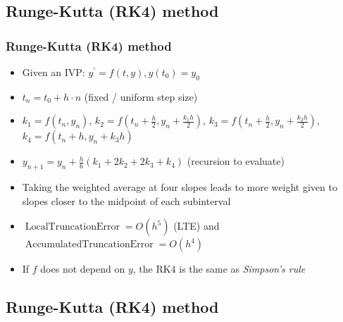 \documentclass[usenames,svgnames,dvipsnames,10pt]{beamer}
\begin{document}
\subsection{Runge-Kutta (RK4) method}

\begin{frame}
\frametitle{Runge-Kutta (RK4) method}

\begin{itemize} 

\item Given an IVP: $y^{\prime} = f(t, y), y(t_0) = y_0$ 
\item $t_n = t_0 +h \cdot n$ (fixed / uniform step size)
\item $k_1 = f(t_n, y_n)$, $k_2 = f\left(t_n + \frac{h}{2}, y_n + \frac{k_1h}{2}\right)$, 
      $k_3 = f\left(t_n + \frac{h}{2}, y_n + \frac{k_2h}{2}\right)$, $k_4 = f\left(t_n + h, y_n + k_3h\right) $ 
\item $y_{n+1} = y_n + \frac{h}{6}\left(k_1 + 2k_2 + 2k_3 + k_4\right)$ (recursion to evaluate) 
\item Taking the weighted average at four slopes leads to more weight given to slopes closer to the midpoint 
      of each subinterval 
\item $\operatorname{LocalTruncationError} = O(h^5)$ (LTE) and $\operatorname{AccumulatedTruncationError} = O(h^4)$ 
\item If $f$ does not depend on $y$, the RK4 is the same as \emph{Simpson's rule} 

\end{itemize} 

\end{frame}

\subsection{Runge-Kutta (RK4) method}
\end{document}
